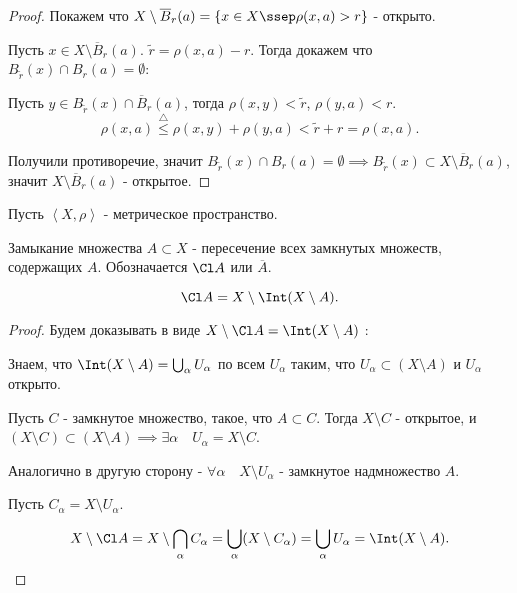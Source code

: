 \begin{properties}
\begin{enumerate}
\begin{proof}
                Покажем что $X \setminus \overline{B}_{r}(a) = \{x\in X \ssep \rho(x, a) > r\} $ - открыто.

                Пусть $x\in X \setminus \overline{B}_{r}(a)$. $\tilde{r} = \rho(x, a) - r$. Тогда докажем что $B_{\tilde{r}}(x)\cap B_{r}(a) = \emptyset$:

                Пусть $y\in B_{\tilde{r}}(x)\cap \overline{B}_{r}(a)$, тогда $\rho(x, y) < \tilde{r}$, $\rho(y, a) < r$.
                \[ \rho(x, a) \overset{\triangle}{\le} \rho(x, y) + \rho(y, a) < \tilde{r} + r = \rho(x, a)  .\]

                Получили противоречие, значит $B_{\tilde{r}}(x)\cap B_{r}(a) = \emptyset \implies B_{\tilde{r}}(x) \subset X \setminus \overline{B}_{r}(a)$, значит $X \setminus \overline{B}_{r}(a)$ - открытое.
            \end{proof}
    \end{enumerate}
\end{properties}

\begin{definition} \thmslashn 

    Пусть $\left<X, \rho\right>$ - метрическое пространство.

    Замыкание множества $A \subset X$ - пересечение всех замкнутых множеств, содержащих $A$. Обозначается $\Cl A$ или $\overline{A}$.
\end{definition}

\begin{theorem} \thmslashn

    \[ \Cl A = X \setminus \Int (X \setminus A) .\]
    \begin{proof} \thmslashn
    
        Будем доказывать в виде $X \setminus \Cl A = \Int (X \setminus A)$ :

        Знаем, что $\Int (X \setminus A) = \bigcup_{\alpha} U_{\alpha}$ по всем $U_{\alpha}$ таким, что $U_{\alpha} \subset (X \setminus A)$ и $U_{\alpha}$ открыто.

        Пусть $C$ - замкнутое множество, такое, что $A \subset C$. Тогда $X \setminus C$ - открытое, и $(X \setminus C) \subset (X \setminus A) \implies \exists{\alpha}\quad U_{\alpha} = X \setminus C$.

        Аналогично в другую сторону - $\forall{\alpha}\quad X \setminus U_{\alpha}$ - замкнутое надмножество $A$.

        Пусть $C_{\alpha} = X \setminus U_{\alpha}$.

        \[ X \setminus \Cl A = X \setminus \bigcap_{\alpha} C_{\alpha} = \bigcup_{\alpha} (X \setminus C_{\alpha}) = \bigcup_{\alpha} U_{\alpha} = \Int (X \setminus A). \qedhere\] 


    \end{proof}
\end{theorem}
